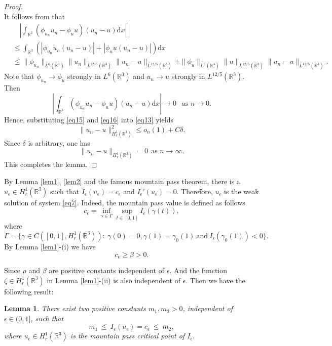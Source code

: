 \documentclass[12pt]{amsart}
\numberwithin{equation}{section}
\newtheorem{lemma}[theorem]{Lemma}
\theoremstyle{definition}
\begin{document}
\begin{proof}
\begin{equation}
\end{equation}
It follows from \cite[Lemma 1]{MR3148130} that
\begin{equation*}
	\begin{split}
&\quad\left|\int_{\mathbb R^3}(\phi_{u_n}u_n-\phi_uu)(u_n-u)\text{d}x\right|\\
&\leq\int_{\mathbb R^3}\left(\left|\phi_{u_n}u_n(u_n-u)\right|+\left|\phi_uu(u_n-u)\right|\right)\text{d}x\\
&\leq \|\phi_{u_n}\|_{L^6{(\mathbb R^3)}}\|{u_n}\|_{L^{12/5}{(\mathbb R^3)}}\|{u_n-u}\|_{L^{12/5}{(\mathbb R^3)}}+\|\phi_{u}\|_{L^6{(\mathbb R^3)}}\|{u}\|_{L^{12/5}{(\mathbb R^3)}}\|{u_n-u}\|_{L^{12/5}{(\mathbb R^3)}}.
\end{split}\end{equation*}
Note that $\phi_{u_n}\rightarrow\phi_u$ strongly in $L^6(\mathbb R^3)$ and $u_n\rightarrow u$ strongly in $L^{12/5}{(\mathbb R^3)}$. Then
\begin{equation}\label{eq16}
	\left|\int_{\mathbb R^3}(\phi_{u_n}u_n-\phi_uu)(u_n-u)\text{d}x\right| \rightarrow 0\ \ \text{ as }n\rightarrow0.
	\end{equation}
Hence, substituting \eqref{eq15} and \eqref{eq16} into \eqref{eq13} yields
\begin{equation*}
	\|u_n-u\|^{2}_{H^1_r(\mathbb R^3)}\leq o_n(1)+C\delta.
\end{equation*}
Since  $\delta$ is arbitrary, one has
\begin{equation*}
	\|u_n-u\|_{H^1_r(\mathbb R^3)}=0\ \ \text{as }n\rightarrow\infty.
\end{equation*}
This completes the lemma.
\end{proof}
By Lemma \ref{lem1}, \ref{lem2} and the famous mountain pass theorem, there is a $u_{\epsilon}\in H^1_r(\mathbb R^3)$ such that $I_{\epsilon}(u_{\epsilon})=c_{\epsilon}$ and $I_{\epsilon}'(u_{\epsilon})=0$. Therefore, $u_{\epsilon}$ is the weak solution of system \eqref{eq7}. Indeed, the mountain pass value is defined as follows
$$c_{\epsilon}=\inf\limits_{\gamma\in\Gamma}\sup\limits_{t\in[0,1]}I_{\epsilon}(\gamma(t)),$$
where
$$\Gamma=\{\gamma\in C([0,1],H^{1}_{r}(\mathbb{R}^3)):~\gamma(0)=0,\gamma(1)=\gamma_0(1)~\text{and}~I_{\epsilon}(\gamma_0(1))<0\}.$$
By Lemma \ref{lem1}-(i) we have
\begin{equation}\label{3.10}
c_{\epsilon}\ge \beta>0.
\end{equation}


Since $\rho$ and $\beta$ are positive constants independent of $\epsilon$. And the function $\zeta\in H^{1}_{r}(\mathbb{R}^3)$ in Lemma \ref{lem1}-(ii) is also independent of $\epsilon$. Then we have the following result:
\begin{lemma}
	There exist two positive constants \(m_{1},m_{2}>0\), independent of \(\epsilon\in(0,1]\), such that
	\[
	m_{1}\ \le\ I_{\epsilon}(u_{\epsilon})=c_{\epsilon}\ \le\ m_{2},
	\]
	where \(u_{\epsilon}\in H^{1}_{r}(\mathbb{R}^3)\) is the mountain pass critical point of \(I_{\epsilon}\).
\end{lemma}
\end{document}
